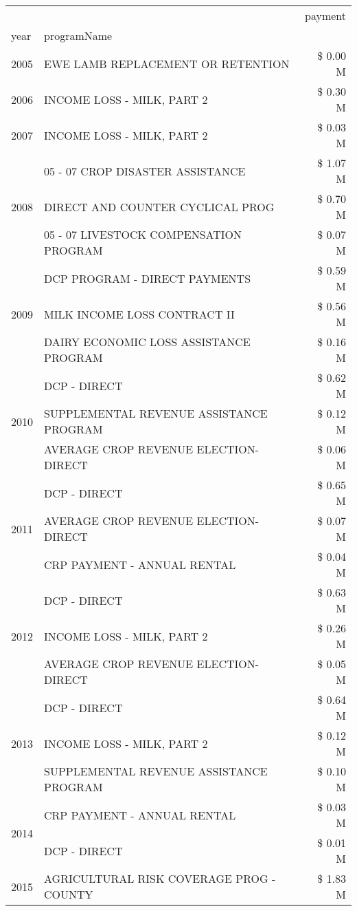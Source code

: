 \begin{tabular}{llr}
\toprule
 &  & payment \\
year & programName &  \\
\midrule
2005 & EWE LAMB REPLACEMENT OR RETENTION & \$ 0.00 M \\
\cline{1-3}
2006 & INCOME LOSS - MILK, PART 2 & \$ 0.30 M \\
\cline{1-3}
2007 & INCOME LOSS - MILK, PART 2 & \$ 0.03 M \\
\cline{1-3}
\multirow[t]{3}{*}{2008} & 05 - 07 CROP DISASTER ASSISTANCE & \$ 1.07 M \\
 & DIRECT AND COUNTER CYCLICAL PROG & \$ 0.70 M \\
 & 05 - 07 LIVESTOCK COMPENSATION PROGRAM & \$ 0.07 M \\
\cline{1-3}
\multirow[t]{3}{*}{2009} & DCP PROGRAM - DIRECT PAYMENTS & \$ 0.59 M \\
 & MILK INCOME LOSS CONTRACT II & \$ 0.56 M \\
 & DAIRY ECONOMIC LOSS ASSISTANCE PROGRAM & \$ 0.16 M \\
\cline{1-3}
\multirow[t]{3}{*}{2010} & DCP - DIRECT & \$ 0.62 M \\
 & SUPPLEMENTAL REVENUE ASSISTANCE PROGRAM & \$ 0.12 M \\
 & AVERAGE CROP REVENUE ELECTION-DIRECT & \$ 0.06 M \\
\cline{1-3}
\multirow[t]{3}{*}{2011} & DCP - DIRECT & \$ 0.65 M \\
 & AVERAGE CROP REVENUE ELECTION-DIRECT & \$ 0.07 M \\
 & CRP PAYMENT - ANNUAL RENTAL & \$ 0.04 M \\
\cline{1-3}
\multirow[t]{3}{*}{2012} & DCP - DIRECT & \$ 0.63 M \\
 & INCOME LOSS - MILK, PART 2 & \$ 0.26 M \\
 & AVERAGE CROP REVENUE ELECTION-DIRECT & \$ 0.05 M \\
\cline{1-3}
\multirow[t]{3}{*}{2013} & DCP - DIRECT & \$ 0.64 M \\
 & INCOME LOSS - MILK, PART 2 & \$ 0.12 M \\
 & SUPPLEMENTAL REVENUE ASSISTANCE PROGRAM & \$ 0.10 M \\
\cline{1-3}
\multirow[t]{2}{*}{2014} & CRP PAYMENT - ANNUAL RENTAL & \$ 0.03 M \\
 & DCP - DIRECT & \$ 0.01 M \\
\cline{1-3}
\multirow[t]{3}{*}{2015} & AGRICULTURAL RISK COVERAGE PROG - COUNTY & \$ 1.83 M \\

\end{tabular}
